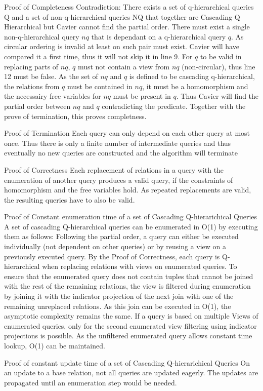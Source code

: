 \documentclass[]{article}
\begin{document}
\begin{section}{Proof of Completeness}
	Contradiction: There exists a set of q-hierarchical queries Q and a set of non-q-hierarchical queries NQ that together are Cascading Q Hierarchical but Cavier cannot find the partial order. There must exist a single non-q-hierarchical query $nq$ that is dependant on a q-hierarchical query $q$. As circular ordering is invalid at least on such pair must exist.
	Cavier will have compared it a first time, thus it will not skip it in line 9.
	For $q$ to be valid in replacing parts of $nq$, $q$ must not contain a view from $nq$ (non-circular), thus line 12 must be false.
	As the set of $nq$ and $q$ is defined to be cascading q-hierarchical, the relations from $q$ must be contained in $nq$, it must be a homomorphism and the necessairy free variables for $nq$ must be present in $q$. Thus Cavier will find the partial order between $nq$ and $q$ contradicting the predicate.
	Together with the prove of termination, this proves completness.
	
\end{section}
\begin{section}{Proof of Termination}
	Each query can only depend on each other query at most once. Thus there is only a finite number of intermediate queries and thus eventually no new queries are constructed and the algorithm will terminate	
\end{section}
\begin{section}{Proof of Correctness}
	Each replacement of relations in a query with the enumeration of another query produces a valid query, if the constraints of homomorphism and the free variables hold. As repeated replacements are valid, the resulting queries have to also be valid.
\end{section}

\begin{section}{Proof of Constant enumeration time of a set of Cascading Q-hierarichical Queries}
A set of cascading Q-hierarchical queries can be enumerated in O(1) by executing them as follows:
Following the partial order, a query can either be executed individually (not dependent on other queries) or by reusing a view on a previously executed query. By the Proof of Correctness, each query is Q-hierarchical when replacing relations with views on enumerated queries. To ensure that the enumerated query does not contain tuples that cannot be joined with the rest of the  remaining relations, the view is filtered during enumeration by joining it with the indicator projection of the next join with one of the remaining unreplaced relations. As this join can be executed in O(1), the asymptotic complexity remains the same. 
If a query is based on multiple Views of enumerated queries, only for the second enumerated view filtering using indicator projections is possible. As the unfiltered enumerated query allows constant time lookup, O(1) can be maintained.
\end{section}

\begin{section}{Proof of  constant update time of a set of Cascading Q-hierarichical Queries}
	On an update to a base relation, not all queries are updated eagerly. The updates are propagated until an enumeration step would be needed.
\end{section}
\end{document}
